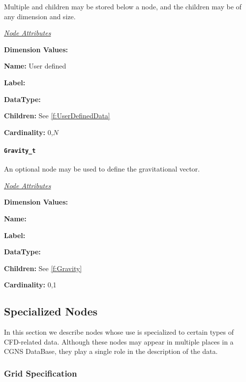 Multiple  and  children
may be stored below a  node, and the
 children may be of any dimension and size.

\textit{\uline{Node Attributes}}
\begin{Ventryic}{\textbf{Dimension Values:}}
\item [\textbf{Name:}]
      User defined
\item [\textbf{Label:}]
\item [\textbf{DataType:}]
\item [\textbf{Children:}]
      See \autoref{f:UserDefinedData}
\item [\textbf{Cardinality:}]
      0,$N$
\end{Ventryic}

\paragraph{\texttt{Gravity\_t}}

An optional  node may be used to define the
gravitational vector.

\textit{\uline{Node Attributes}}
\begin{Ventryic}{\textbf{Dimension Values:}}
\item [\textbf{Name:}]
\item [\textbf{Label:}]
\item [\textbf{DataType:}]
\item [\textbf{Children:}]
      See \autoref{f:Gravity}
\item [\textbf{Cardinality:}]
      0,1
\end{Ventryic}

\subsection{Specialized Nodes}
\label{s:specializednodes}

In this section we describe nodes whose use is specialized to certain
types of CFD-related data. Although these nodes may appear in multiple
places in a CGNS DataBase, they play a single role in the description of
the data.

\subsubsection{Grid Specification}

